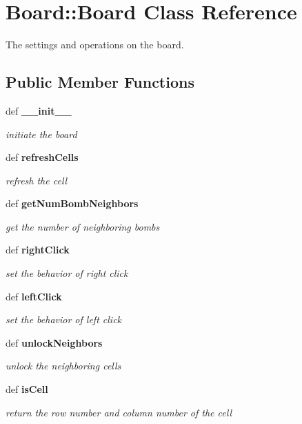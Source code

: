 \section{Board::Board Class Reference}
\label{classBoard_1_1Board}
The settings and operations on the board.  


\subsection*{Public Member Functions}
\begin{CompactItemize}
\item 
def \bf{\_\-\_\-init\_\-\_\-}
\begin{CompactList}\small\item\em initiate the board \item\end{CompactList}\item 
def \bf{refresh\-Cells}
\begin{CompactList}\small\item\em refresh the cell \item\end{CompactList}\item 
def \bf{get\-Num\-Bomb\-Neighbors}
\begin{CompactList}\small\item\em get the number of neighboring bombs \item\end{CompactList}\item 
def \bf{right\-Click}
\begin{CompactList}\small\item\em set the behavior of right click \item\end{CompactList}\item 
def \bf{left\-Click}
\begin{CompactList}\small\item\em set the behavior of left click \item\end{CompactList}\item 
def \bf{unlock\-Neighbors}
\begin{CompactList}\small\item\em unlock the neighboring cells \item\end{CompactList}\item 
def \bf{is\-Cell}
\begin{CompactList}\small\item\em return the row number and column number of the cell \item\end{CompactList}\item 

\end{CompactItemize}
